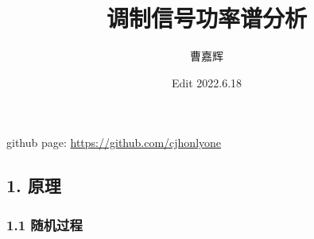 \documentclass[
]{article}
\title{\huge \textbf{调制信号功率谱分析}}
\author{曹嘉辉}
\date{Edit 2022.6.18}
\begin{document}
\maketitle

github page: \url{https://github.com/cjhonlyone}

\tableofcontents

\newpage
\hypertarget{header-n3}{%
\subsection{1. 原理}\label{header-n3}}

\hypertarget{header-n4}{%
\subsubsection{1.1 随机过程}\label{header-n4}}
\end{document}

